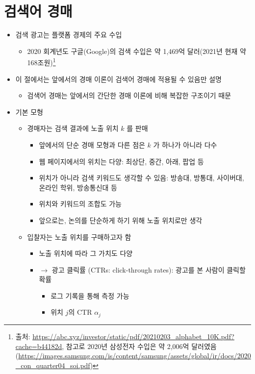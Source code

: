 \section{검색어 경매}
\begin{itemize}
\item 검색 광고는 플랫폼 경제의 주요 수입
	\begin{itemize}
	\item 2020 회계년도 구글(Google)의 검색 수입은 약 1,469억 달러(2021년 현재 약 168조원)\footnote{출처: \url{https://abc.xyz/investor/static/pdf/20210203_alphabet_10K.pdf?cache=b44182d}, 참고로  2020년 삼성전자 수입은 약 2,006억 달러였음(\url{https://images.samsung.com/is/content/samsung/assets/global/ir/docs/2020_con_quarter04_soi.pdf})}
	\end{itemize}
\item 이 절에서는 앞에서의 경매 이론이 검색어 경매에 적용될 수 있음만 설명
	\begin{itemize}
	\item 검색어 경매는 앞에서의 간단한 경매 이론에 비해 복잡한 구조이기 때문
	\end{itemize}
\item 기본 모형
	\begin{itemize}
	\item 경매자는 검색 결과에 노출 위치 $k$ 를 판매
		\begin{itemize}
		\item 앞에서의 단순 경매 모형과 다른 점은 $k$ 가 하나가 아니라 다수
		\item 웹 페이지에서의 위치는 다양: 최상단, 중간, 아래, 팝업 등
		\item 위치가 아니라 검색 키워드도 생각할 수 있음: 방송대, 방통대, 사이버대, 온라인 학위, 방송통신대 등
		\item 위치와 키워드의 조합도 가능
		\item 앞으로는, 논의를 단순하게 하기 위해 노출 위치로만 생각
		\end{itemize}
	\item 입찰자는 노출 위치를 구매하고자 함
		\begin{itemize}
		\item 노출 위치에 따라 그 가치도 다양
		\item $\rightarrow$ 광고 클릭률 (CTRs: click-through rates): 광고를 본 사람이 클릭할 확률
			\begin{itemize}
			\item 로그 기록을 통해 측정 가능
			\item 위치 $j$의 CTR $\alpha_{j}$
			\end{itemize}

\end{itemize}
\end{itemize}
\end{itemize}
